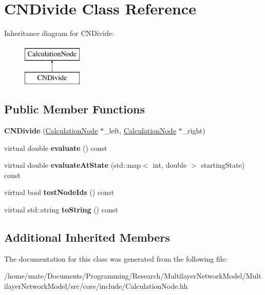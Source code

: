 \hypertarget{classCNDivide}{}\section{C\+N\+Divide Class Reference}
\label{classCNDivide}
Inheritance diagram for C\+N\+Divide\+:\begin{figure}[H]
\begin{center}
\leavevmode
\includegraphics[height=2.000000cm]{classCNDivide}
\end{center}
\end{figure}
\subsection*{Public Member Functions}
\begin{DoxyCompactItemize}
\item 
{\bfseries C\+N\+Divide} (\hyperlink{classCalculationNode}{Calculation\+Node} $\ast$\+\_\+left, \hyperlink{classCalculationNode}{Calculation\+Node} $\ast$\+\_\+right)\hypertarget{classCNDivide_afeb9424f787f42ebf0edb7926a0e80fd}{}\label{classCNDivide_afeb9424f787f42ebf0edb7926a0e80fd}

\item 
virtual double {\bfseries evaluate} () const \hypertarget{classCNDivide_a416c36cec11a481a20bbe3409c1e42db}{}\label{classCNDivide_a416c36cec11a481a20bbe3409c1e42db}

\item 
virtual double {\bfseries evaluate\+At\+State} (std\+::map$<$ int, double $>$ starting\+State) const \hypertarget{classCNDivide_a77752426072bc2bda3b0ca4fdc03f871}{}\label{classCNDivide_a77752426072bc2bda3b0ca4fdc03f871}

\item 
virtual bool {\bfseries test\+Node\+Ids} () const \hypertarget{classCNDivide_a411f954df8b87778f20058ce6601d3f8}{}\label{classCNDivide_a411f954df8b87778f20058ce6601d3f8}

\item 
virtual std\+::string {\bfseries to\+String} () const \hypertarget{classCNDivide_a301fb85c372986362aa6b4930f0d79c5}{}\label{classCNDivide_a301fb85c372986362aa6b4930f0d79c5}

\end{DoxyCompactItemize}
\subsection*{Additional Inherited Members}


The documentation for this class was generated from the following file\+:\begin{DoxyCompactItemize}
\item 
/home/mate/\+Documents/\+Programming/\+Research/\+Multilayer\+Network\+Model/\+Multilayer\+Network\+Model/src/core/include/Calculation\+Node.\+hh\end{DoxyCompactItemize}
